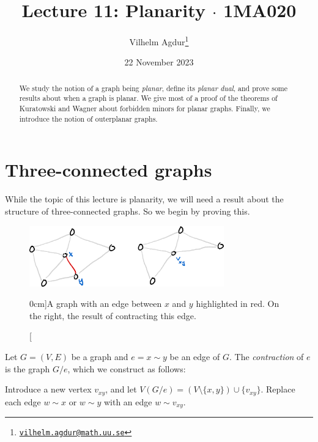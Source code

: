 \documentclass[nobib]{tufte-handout}
\title{Lecture 11: Planarity $\cdot$ 1MA020}
\author[Vilhelm Agdur]{Vilhelm Agdur\thanks{\href{mailto:vilhelm.agdur@math.uu.se}{\nolinkurl{vilhelm.agdur@math.uu.se}}}}
\date{22 November 2023}
\begin{document}
\maketitle%

\begin{abstract}
\noindent
We study the notion of a graph being \emph{planar}, define its \emph{planar dual}, and prove some results about when a graph is planar. We give most of a proof of the theorems of Kuratowski and Wagner about forbidden minors for planar graphs. Finally, we introduce the notion of outerplanar graphs.
\end{abstract}

\section{Three-connected graphs}

While the topic of this lecture is planarity, we will need a result about the structure of three-connected graphs. So we begin by proving this.

\begin{figure}
  \centering
  \includegraphics[width=0.75\textwidth]{graphics/L10_connectivity/edge_contraction.png}
  \caption[][0cm]{A graph with an edge between $x$ and $y$ highlighted in red. On the right, the result of contracting this edge.}
  \label{fig:edge_contraction}
\end{figure}

\begin{definition}
  Let $G = (V,E)$ be a graph and $e = x\sim y$ be an edge of $G$. The \emph{contraction} of $e$ is the graph $G/e$, which we construct as follows:

  Introduce a new vertex $v_{xy}$, and let $V(G/e) = (V \setminus \{x,y\}) \cup \{v_{xy}\}$. Replace each edge $w \sim x$ or $w \sim y$ with an edge $w \sim v_{xy}$.
\end{definition}
\end{document}
